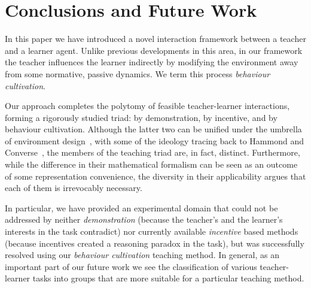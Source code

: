 \section{Conclusions and Future Work}\label{sec: future work}

In this paper we have introduced a novel interaction framework between
a teacher and a learner agent. Unlike previous developments in this
area, in our framework the teacher influences the learner indirectly by
modifying the environment away from some normative, passive
dynamics. We term this process {\em behaviour cultivation}.

Our approach completes the polytomy of feasible teacher-learner
interactions, forming a rigorously studied triad: by demonstration, by
incentive, and by behaviour cultivation. Although the latter two can
be unified under the umbrella of environment
design~\cite{Zhang09:General}, with some of the ideology tracing back
to Hammond and Converse~\cite{hammond_converse_91}, the members of the
teaching triad are, in fact, distinct. Furthermore, while the
difference in their mathematical formalism can be seen as an outcome
of some representation convenience, the diversity in their
applicability argues that each of them is irrevocably necessary.


In particular, we have provided an experimental domain that could not
be addressed by neither {\em demonstration} (because the teacher's and
the learner's interests in the task contradict) nor currently
available {\em incentive} based methods (because incentives created a
reasoning paradox in the task), but was successfully resolved using
our {\em behaviour cultivation} teaching method. In general, as an
important part of our future work we see the classification of various
teacher-learner tasks into groups that are more suitable for a
particular teaching method.

